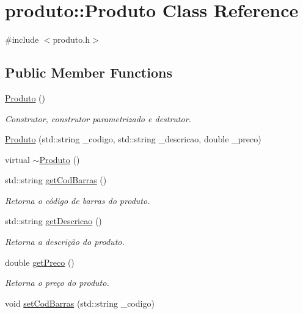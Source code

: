 \hypertarget{classproduto_1_1Produto}{}\section{produto\+:\+:Produto Class Reference}
\label{classproduto_1_1Produto}


{\ttfamily \#include $<$produto.\+h$>$}

\subsection*{Public Member Functions}
\begin{DoxyCompactItemize}
\item 
\hyperlink{classproduto_1_1Produto_ac3d96768b8b6b67ae8066b704761071a}{Produto} ()
\begin{DoxyCompactList}\small\item\em Construtor, construtor parametrizado e destrutor. \end{DoxyCompactList}\item 
\hyperlink{classproduto_1_1Produto_a8e9da9e547e4bb92539dd4687451cf09}{Produto} (std\+::string \+\_\+codigo, std\+::string \+\_\+descricao, double \+\_\+preco)
\item 
virtual \hyperlink{classproduto_1_1Produto_a14eeea10c0112fafaf5cb5a24ce028b8}{$\sim$\+Produto} ()
\item 
std\+::string \hyperlink{classproduto_1_1Produto_a6dbe3ecb8ff8b7b72a18ac70d52db292}{get\+Cod\+Barras} ()
\begin{DoxyCompactList}\small\item\em Retorna o código de barras do produto. \end{DoxyCompactList}\item 
std\+::string \hyperlink{classproduto_1_1Produto_a670047a018e413208f6a7ee37fef6ce0}{get\+Descricao} ()
\begin{DoxyCompactList}\small\item\em Retorna a descrição do produto. \end{DoxyCompactList}\item 
double \hyperlink{classproduto_1_1Produto_ac316d4a9e294ba556de0ce7860b7f8cf}{get\+Preco} ()
\begin{DoxyCompactList}\small\item\em Retorna o preço do produto. \end{DoxyCompactList}\item 
void \hyperlink{classproduto_1_1Produto_a23abca118c602f8e004800ae0c3764f0}{set\+Cod\+Barras} (std\+::string \+\_\+codigo)

\end{DoxyCompactItemize}
